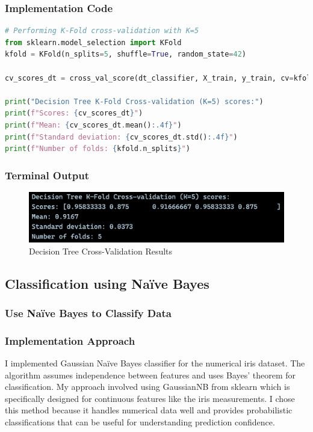 \documentclass[12pt,a4paper]{article}
\begin{document}
\subsubsection{Implementation Code}
\begin{lstlisting}[language=Python, caption=K-Fold Cross-Validation for Decision Tree]
# Performing K-Fold cross-validation with K=5
from sklearn.model_selection import KFold
kfold = KFold(n_splits=5, shuffle=True, random_state=42)

cv_scores_dt = cross_val_score(dt_classifier, X_train, y_train, cv=kfold)

print("Decision Tree K-Fold Cross-validation (K=5) scores:")
print(f"Scores: {cv_scores_dt}")
print(f"Mean: {cv_scores_dt.mean():.4f}")
print(f"Standard deviation: {cv_scores_dt.std():.4f}")
print(f"Number of folds: {kfold.n_splits}")
\end{lstlisting}

\subsubsection{Terminal Output}

\begin{figure}[h!]
\centering
     \includegraphics[width=\textwidth]{Figures/cross.png}
    \caption{Decision Tree Cross-Validation Results}
\end{figure}

\subsection{Classification using Na\"{i}ve Bayes}

\subsubsection{Use Na\"{i}ve Bayes to Classify Data}

\subsubsection{Implementation Approach}
I implemented Gaussian Na\"{i}ve Bayes classifier for the numerical iris dataset. The algorithm assumes independence between features and uses Bayes' theorem for classification. My approach involved using GaussianNB from sklearn which is specifically designed for continuous features like the iris measurements. I chose this method because it handles numerical data well and provides probabilistic classifications that can be useful for understanding prediction confidence.
\end{document}
